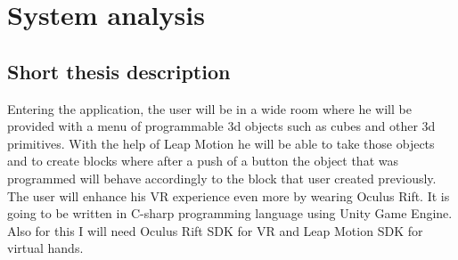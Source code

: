 \section{System analysis}

\subsection{Short thesis description}
Entering the application, the user will be in a wide room where he will be provided with a menu of programmable 3d objects such as cubes and other 3d primitives. With the help of Leap Motion he will be able to take those objects and to create blocks where after a push of a button the object that was programmed will behave accordingly to the block that user created previously. The user will enhance his VR experience even more by wearing Oculus Rift. It is going to be written in C-sharp programming language using Unity Game Engine. Also for this I will need Oculus Rift SDK for VR and Leap Motion SDK for virtual hands.

\clearpage